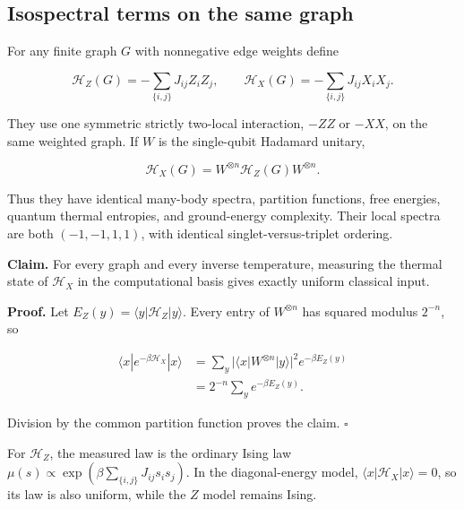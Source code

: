 \subsection{Isospectral terms on the same graph}\label{quant:sec-2}

For any finite graph \(G\) with nonnegative edge weights define

\[
\mathcal H_Z(G)=-\sum_{\{i,j\}}J_{ij}Z_iZ_j,\qquad
\mathcal H_X(G)=-\sum_{\{i,j\}}J_{ij}X_iX_j.
\]

They use one symmetric strictly two-local interaction, \(-ZZ\) or
\(-XX\), on the same weighted graph. If \(W\) is the single-qubit
Hadamard unitary,

\[
\mathcal H_X(G)=W^{\otimes n}\mathcal H_Z(G)W^{\otimes n}.
\]

Thus they have identical many-body spectra, partition functions, free
energies, quantum thermal entropies, and ground-energy complexity. Their
local spectra are both \((-1,-1,1,1)\), with identical
singlet-versus-triplet ordering.

\textbf{Claim.} For every graph and every inverse temperature, measuring
the thermal state of \(\mathcal H_X\) in the computational basis gives
exactly uniform classical input.

\textbf{Proof.} Let \(E_Z(y)=\langle y|\mathcal H_Z|y\rangle\). Every
entry of \(W^{\otimes n}\) has squared modulus \(2^{-n}\), so

\[
\begin{aligned}
\langle x|e^{-\beta\mathcal H_X}|x\rangle
&=\sum_y|\langle x|W^{\otimes n}|y\rangle|^2e^{-\beta E_Z(y)}\\
&=2^{-n}\sum_y e^{-\beta E_Z(y)}.
\end{aligned}
\]

Division by the common partition function proves the claim. \(\square\)

For \(\mathcal H_Z\), the measured law is the ordinary Ising law
\(\mu(s)\propto\exp(\beta\sum_{\{i,j\}}J_{ij}s_is_j)\). In the
diagonal-energy model, \(\langle x|\mathcal H_X|x\rangle=0\), so its law
is also uniform, while the \(Z\) model remains Ising.
